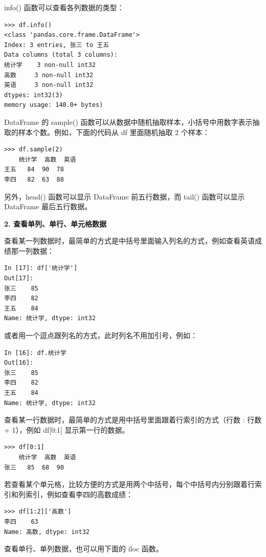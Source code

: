 info() 函数可以查看各列数据的类型：

\begin{lstlisting}[Language=Python]
>>> df.info()
<class 'pandas.core.frame.DataFrame'>
Index: 3 entries, 张三 to 王五
Data columns (total 3 columns):
统计学    3 non-null int32
高数     3 non-null int32
英语     3 non-null int32
dtypes: int32(3)
memory usage: 140.0+ bytes)
\end{lstlisting}

DataFrame 的 sample() 函数可以从数据中随机抽取样本，小括号中用数字表示抽取的样本个数。例如，下面的代码从 df 里面随机抽取 2 个样本：
\begin{lstlisting}[Language=Python]
>>> df.sample(2)
    统计学  高数  英语
王五   84  90  78
李四   82  63  88
\end{lstlisting}


另外，head() 函数可以显示 DataFrame 前五行数据，而 tail() 函数可以显示 DataFrame 最后五行数据。

\noindent\textbf{2. 查看单列、单行、单元格数据}

查看某一列数据时，最简单的方式是中括号里面输入列名的方式，例如查看英语成绩那一列数据：
\begin{lstlisting}[Language=Python]
In [17]: df['统计学']
Out[17]:
张三    85
李四    82
王五    84
Name: 统计学, dtype: int32
\end{lstlisting}

或者用一个逗点跟列名的方式，此时列名不用加引号，例如：

\begin{lstlisting}[Language=Python]
In [16]: df.统计学
Out[16]:
张三    85
李四    82
王五    84
Name: 统计学, dtype: int32
\end{lstlisting}


查看某一行数据时，最简单的方式是用中括号里面跟着行索引的方式（行数 : 行数 + 1），例如 df[0:1] 显示第一行的数据。

\begin{lstlisting}[Language=Python]
>>> df[0:1]
    统计学  高数  英语
张三   85  68  90
\end{lstlisting}

若查看某个单元格，比较方便的方式是用两个中括号，每个中括号内分别跟着行索引和列索引，例如查看李四的高数成绩：
\begin{lstlisting}[Language=Python]
>>> df[1:2]['高数']
李四    63
Name: 高数, dtype: int32
\end{lstlisting}

查看单行、单列数据，也可以用下面的 iloc 函数。

